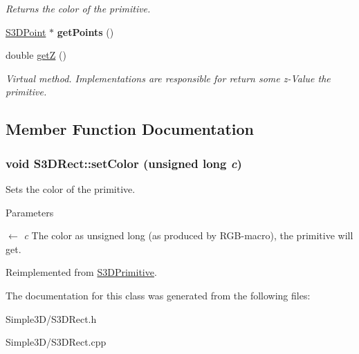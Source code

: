 \begin{DoxyCompactItemize}
\begin{DoxyCompactList}\small\item\em Returns the color of the primitive. \item\end{DoxyCompactList}\item 
\hypertarget{class_s3_d_rect_a626b39ee85c2ab329258bba6ee0ac255}{
\hyperlink{class_s3_d_point}{S3DPoint} $\ast$ {\bfseries getPoints} ()}
\label{class_s3_d_rect_a626b39ee85c2ab329258bba6ee0ac255}

\item 
\hypertarget{class_s3_d_rect_a7b3fb925a55d8a22a354829d6a5afa3d}{
double \hyperlink{class_s3_d_rect_a7b3fb925a55d8a22a354829d6a5afa3d}{getZ} ()}
\label{class_s3_d_rect_a7b3fb925a55d8a22a354829d6a5afa3d}

\begin{DoxyCompactList}\small\item\em Virtual method. Implementations are responsible for return some z-\/Value the primitive. \item\end{DoxyCompactList}\end{DoxyCompactItemize}


\subsection{Member Function Documentation}
\hypertarget{class_s3_d_rect_af1a976fbe476e7096b2ceded7ab1659c}{
\subsubsection[{setColor}]{\setlength{\rightskip}{0pt plus 5cm}void S3DRect::setColor (unsigned long {\em c})}}
\label{class_s3_d_rect_af1a976fbe476e7096b2ceded7ab1659c}


Sets the color of the primitive. 


\begin{DoxyParams}{Parameters}
\item[\mbox{$\leftarrow$} {\em c}]The color as unsigned long (as produced by RGB-\/macro), the primitive will get. \end{DoxyParams}


Reimplemented from \hyperlink{class_s3_d_primitive_a1c8f036193987522bdfb6a49b9b74000}{S3DPrimitive}.



The documentation for this class was generated from the following files:\begin{DoxyCompactItemize}
\item 
Simple3D/S3DRect.h\item 
Simple3D/S3DRect.cpp\end{DoxyCompactItemize}
